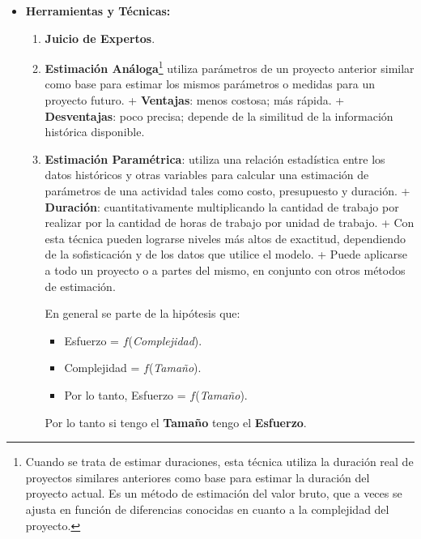 \documentclass[10pt,a4paper]{article}
\begin{document}
\begin{itemize}
\begin{itemize}
\item \textbf{Herramientas y Técnicas:}
\begin{enumerate}
\item \textbf{Juicio de Expertos}.
\item \textbf{Estimación Análoga}\footnote{Cuando se trata de estimar duraciones, esta técnica utiliza la duración real de proyectos similares anteriores como base para estimar la duración del proyecto actual. Es un método de estimación del valor bruto, que a veces se ajusta en función de diferencias conocidas en cuanto a la complejidad del proyecto.} utiliza parámetros de un proyecto anterior similar como base para estimar los mismos parámetros o medidas para un proyecto futuro.
\subitem + \textbf{Ventajas}: menos costosa; más rápida.
\subitem + \textbf{Desventajas}: poco precisa; depende de la similitud de la información histórica disponible.

\item \textbf{Estimación Paramétrica}: utiliza una relación estadística entre los datos históricos y otras variables para calcular una estimación de parámetros de una actividad tales como costo, presupuesto y duración.
\subitem + \textbf{Duración}: cuantitativamente multiplicando la cantidad de trabajo por realizar por la cantidad de horas de trabajo por unidad de trabajo.
\subitem + Con esta técnica pueden lograrse niveles más altos de exactitud, dependiendo de la sofisticación y de los datos que utilice el modelo.
\subitem + Puede aplicarse a todo un proyecto o a partes del mismo, en conjunto con otros métodos de estimación.

En general se parte de la hipótesis que:
\begin{itemize}
\item Esfuerzo = $f$(\textit{Complejidad}).
\item Complejidad = $f$(\textit{Tamaño}).
\item Por lo tanto, Esfuerzo = $f$(\textit{Tamaño}).
\end{itemize}
Por lo tanto si tengo el \textbf{Tamaño} tengo el \textbf{Esfuerzo}.


\end{enumerate}
\end{itemize}
\end{itemize}
\end{document}
